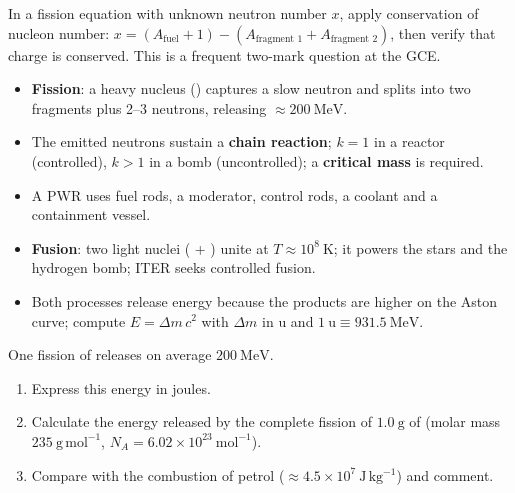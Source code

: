 \documentclass[11pt]{article}
\begin{document}
\begin{methode}
In a fission equation with unknown neutron number $x$, apply conservation of nucleon number: $x = (A_{\text{fuel}} + 1) - (A_{\text{fragment 1}} + A_{\text{fragment 2}})$, then verify that charge is conserved. This is a frequent two-mark question at the GCE.
\end{methode}

\begin{aretenir}
\begin{itemize}
\item \textbf{Fission}: a heavy nucleus () captures a slow neutron and splits into two fragments plus 2--3 neutrons, releasing $\approx 200\ \mathrm{MeV}$.
\item The emitted neutrons sustain a \textbf{chain reaction}; $k = 1$ in a reactor (controlled), $k > 1$ in a bomb (uncontrolled); a \textbf{critical mass} is required.
\item A PWR uses fuel rods, a moderator, control rods, a coolant and a containment vessel.
\item \textbf{Fusion}: two light nuclei ( + ) unite at $T \approx 10^{8}\ \mathrm{K}$; it powers the stars and the hydrogen bomb; ITER seeks controlled fusion.
\item Both processes release energy because the products are higher on the Aston curve; compute $E = \Delta m\,c^{2}$ with $\Delta m$ in u and $1\ \mathrm{u} \equiv 931.5\ \mathrm{MeV}$.
\end{itemize}
\end{aretenir}

\begin{exercice}
One fission of  releases on average $200\ \mathrm{MeV}$.
\begin{enumerate}
\item Express this energy in joules.
\item Calculate the energy released by the complete fission of $1.0\ \mathrm{g}$ of  (molar mass $235\ \mathrm{g\,mol^{-1}}$, $N_{A} = 6.02 \times 10^{23}\ \mathrm{mol^{-1}}$).
\item Compare with the combustion of petrol ($\approx 4.5 \times 10^{7}\ \mathrm{J\,kg^{-1}}$) and comment.
\end{enumerate}
\end{exercice}
\end{document}
